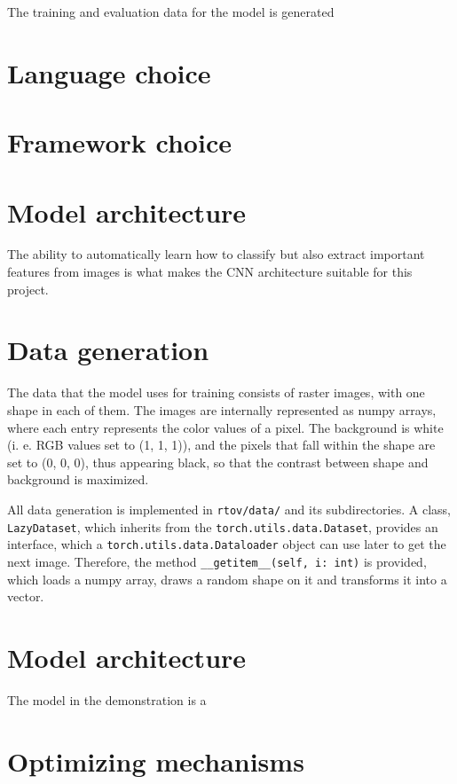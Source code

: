 \documentclass[12pt, a4paper, titlepage]{report}
\begin{document}
The training and evaluation data for the model is generated 

\section{Language choice}

\section{Framework choice}
\section{Model architecture}

The ability to automatically learn how to classify but also extract important features from images is what makes the CNN architecture suitable for this project.


\section{Data generation}

The data that the model uses for training consists of raster images, with one shape in each of them. The images are internally represented as numpy arrays, where each entry represents the color values of a pixel. The background is white (i. e. RGB values set to (1, 1, 1)), and the pixels that fall within the shape are set to (0, 0, 0), thus appearing black, so that the contrast between shape and background is maximized.

All data generation is implemented in \lstinline{rtov/data/} and its subdirectories. A class, \lstinline{LazyDataset}, which inherits from the \lstinline{torch.utils.data.Dataset}, provides an interface, which a \lstinline{torch.utils.data.Dataloader} object can use later to get the next image. Therefore, the method \lstinline{__getitem__(self, i: int)} is provided, which loads a numpy array, draws a random shape on it and transforms it into a vector.

\section{Model architecture}

The model in the demonstration is a 

\section{Optimizing mechanisms}
\end{document}
